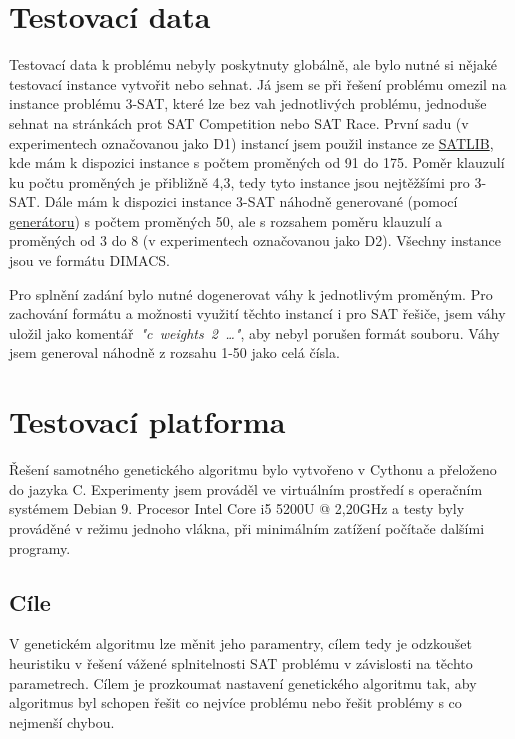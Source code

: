 \documentclass[11pt]{article}
\begin{document}
\section{Testovací data}\label{kap:data}
Testovací data k problému nebyly poskytnuty globálně, ale bylo nutné si nějaké testovací instance vytvořit nebo sehnat. Já jsem se při řešení problému omezil na instance problému 3-SAT, které lze bez vah jednotlivých problému, jednoduše sehnat na stránkách prot SAT Competition nebo SAT Race. První sadu (v experimentech označovanou jako D1) instancí jsem použil instance ze \href{https://www.cs.ubc.ca/~hoos/SATLIB/benchm.html}{SATLIB}, kde mám k dispozici instance s počtem proměných od 91 do 175. Poměr klauzulí ku počtu proměných je přibližně 4,3, tedy tyto instance jsou nejtěžšími pro 3-SAT. Dále mám k dispozici instance 3-SAT náhodně generované (pomocí \href{https://toughsat.appspot.com/}{generátoru}) s počtem proměných 50, ale s rozsahem poměru klauzulí a proměných od 3 do 8 (v experimentech označovanou jako D2). Všechny instance jsou ve formátu DIMACS. 

Pro splnění zadání bylo nutné dogenerovat váhy k jednotlivým proměným. Pro zachování for\-mátu a možnosti využití těchto instancí i pro SAT řešiče, jsem váhy uložil jako komentář~\textit{"c~weights~2~\dots"}, aby nebyl porušen formát souboru. Váhy jsem generoval náhodně z rozsahu 1-50 jako celá čísla. 

\section{Testovací platforma}\label{kap:platform}
Řešení samotného genetického algoritmu bylo vytvořeno v Cythonu a přeloženo do jazyka C. Experimenty jsem prováděl ve virtuálním prostředí s operačním systémem Debian 9. Procesor Intel Core i5 5200U @ 2,20GHz a testy byly prováděné v režimu jednoho vlákna, při minimálním zatížení počítače dalšími programy.
\subsection{Cíle}\label{kap:cil}

V genetickém algoritmu lze měnit jeho paramentry, cílem tedy je odzkoušet heuristiku v řešení vážené splnitelnosti SAT problému v závislosti na těchto parametrech. Cílem je prozkoumat nastavení genetického algoritmu tak, aby algoritmus byl schopen řešit co nejvíce problému nebo řešit problémy s co nejmenší chybou.
\end{document}
